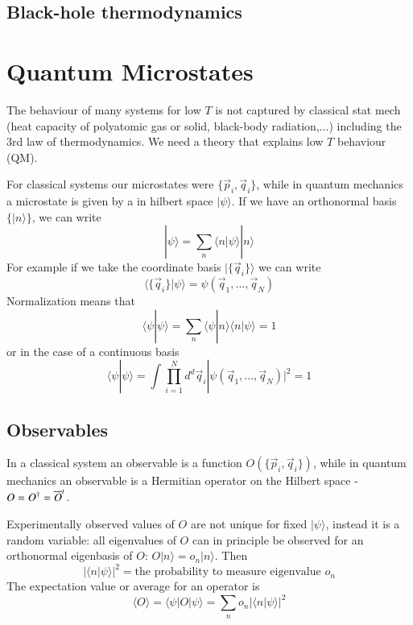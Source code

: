 \documentclass[12pt, a4paper, oneside, openright, titlepage]{book}
\begin{document}
\section{Black-hole thermodynamics}


\chapter{Quantum Microstates}


The behaviour of many systems for low $T$ is not captured by classical stat mech (heat capacity of polyatomic gas or solid, black-body radiation,...) including the 3rd law of thermodynamics. We need a theory that explains low $T$ behaviour (QM).

For classical systems our microstates were $\{\vec{p}_i,\vec{q}_i\}$, while in quantum mechanics a microstate is given by a  in hilbert space $|\psi\rangle$. If we have an orthonormal basis $\{|n\rangle\}$, we can write $$|\psi\rangle = \sum_n\langle n \vert \psi\rangle |n\rangle$$
For example if we take the coordinate basis $|\{\vec{q}_i\}\rangle$ we can write \begin{equation*}
    \langle \{\vec{q}_i\}|\psi\rangle = \psi(\vec{q}_1,...,\vec{q}_N)
\end{equation*}
Normalization means that \begin{equation*}
    \langle \psi|\psi\rangle = \sum_n\langle \psi|n\rangle \langle n|\psi\rangle = 1
\end{equation*}
or in the case of a continuous basis \begin{equation*}
    \langle \psi|\psi\rangle = \int \prod_{i=1}^Nd^d\vec{q}_i|\psi(\vec{q}_1,...,\vec{q}_N)|^2 = 1
\end{equation*}


\section{Observables}

In a classical system an observable is a function $O(\{\vec{p}_i,\vec{q}_i\})$, while in quantum mechanics an observable is a Hermitian operator on the Hilbert space - $O = O^{\text{\textdagger}} = \overline{O}^t$. 

\begin{rmk}
    Experimentally observed values of $O$ are not unique for fixed $|\psi\rangle$, instead it is a random variable: all eigenvalues of $O$ can in principle be observed for an orthonormal eigenbasis of $O$: $O|n\rangle = o_n|n\rangle$. Then $$|\langle n|\psi\rangle|^2 = \text{the probability to measure eigenvalue $o_n$}$$
    The expectation value or average for an operator is \begin{equation*}
        \langle O \rangle = \langle \psi|O|\psi\rangle = \sum_no_n|\langle n|\psi\rangle|^2
    \end{equation*}
\end{rmk}
\end{document}
